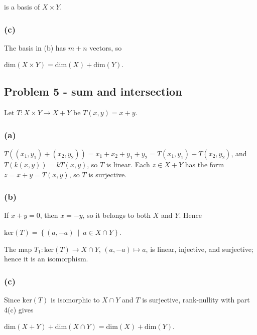 is a basis of \(X \times Y\).

\subsubsection{(c)}

The basis in (b) has \(m + n\) vectors, so

\(\text{dim}\left( {X \times Y} \right) = \text{dim}(X) + \text{dim}(Y).\)

\subsection{Problem 5 - sum and intersection}

Let \(T:X \times Y\rightarrow X + Y\) be \(T\left( {x,y} \right) = x + y\).

\subsubsection{(a)}

\(T\left( {\left( {x_{1},y_{1}} \right) + \left( {x_{2},y_{2}} \right)} \right) = x_{1} + x_{2} + y_{1} + y_{2} = T\left( {x_{1},y_{1}} \right) + T\left( {x_{2},y_{2}} \right)\), and \(T\left( {k\left( {x,y} \right)} \right) = kT\left( {x,y} \right)\), so \(T\) is linear. Each \(z \in X + Y\) has the form \(z = x + y = T\left( {x,y} \right)\), so \(T\) is surjective.

\subsubsection{(b)}

If \(x + y = 0\), then \(x = - y\), so it belongs to both \(X\) and \(Y\). Hence

\(\text{ker}(T) = \left\{ \left( {a, - a} \right)\  \middle| \ a \in X \cap Y \right\}.\)

The map \(T_{1}:\text{ker}(T)\rightarrow X \cap Y\), \(\left( {a, - a} \right)\mapsto a\), is linear, injective, and surjective; hence it is an isomorphism.

\subsubsection{(c)}

Since \(\text{ker}(T)\) is isomorphic to \(X \cap Y\) and \(T\) is surjective, rank-nullity with part 4(c) gives

\(\text{dim}\left( {X + Y} \right) + \text{dim}\left( {X \cap Y} \right) = \text{dim}(X) + \text{dim}(Y).\)

